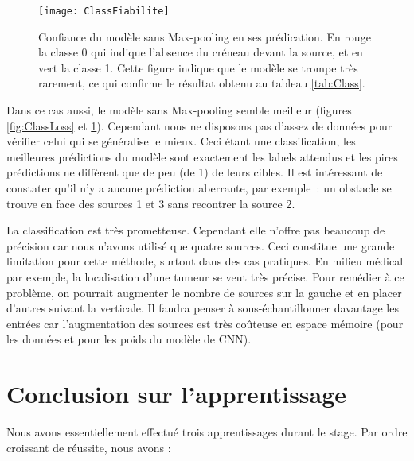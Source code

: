 \begin{figure}[H] 
\centering
\texttt{[image: ClassFiabilite]} 
\decoRule
\caption[ClassFiabilite]{Confiance du modèle sans Max-pooling en ses prédication. En rouge la classe 0 qui indique l'absence du créneau devant la source, et en vert la classe 1. Cette figure indique que le modèle se trompe très rarement, ce qui confirme le résultat obtenu au tableau \ref{tab:Class}.}
\label{fig:ClassFiabilite}
\end{figure}


Dans ce cas aussi, le modèle sans Max-pooling semble meilleur (figures \ref{fig:ClassLoss} et \ref{fig:ClassFiabilite}). Cependant nous ne disposons pas d'assez de données pour vérifier celui qui se généralise le mieux. Ceci étant une classification, les meilleures prédictions du modèle sont exactement les labels attendus et les pires prédictions ne diffèrent que de peu (de 1) de leurs cibles. Il est intéressant de constater qu'il n'y a aucune prédiction aberrante, par exemple : un obstacle se trouve en face des sources 1 et 3 sans recontrer la source 2.

La classification est très prometteuse. Cependant elle n'offre pas beaucoup de précision car nous n'avons utilisé que quatre sources. Ceci constitue une grande limitation pour cette méthode, surtout dans des cas pratiques. En milieu médical par exemple, la localisation d'une tumeur se veut très précise. Pour remédier à ce problème, on pourrait augmenter le nombre de sources sur la gauche et en placer d'autres suivant la verticale. Il faudra penser à sous-échantillonner davantage les entrées car l'augmentation des sources est très coûteuse en espace mémoire (pour les données et pour les poids du modèle de CNN). 


\section{Conclusion sur l'apprentissage}
Nous avons essentiellement effectué trois apprentissages durant le stage. Par ordre croissant de réussite, nous avons :

